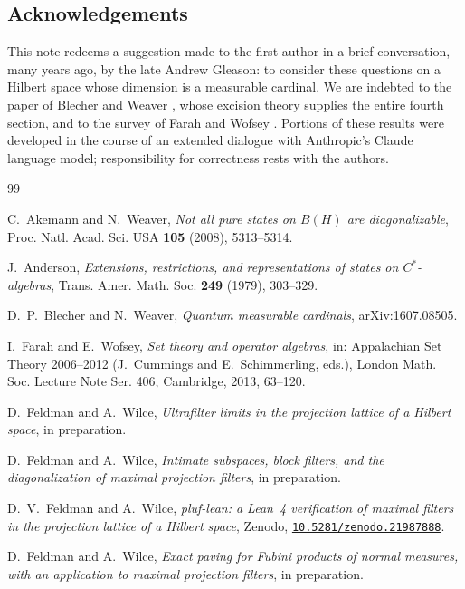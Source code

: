 \documentclass[11pt,reqno]{amsart}
\theoremstyle{definition}
\begin{document}
\subsection*{Acknowledgements}
This note redeems a suggestion made to the first author in a brief conversation, many
years ago, by the late Andrew Gleason: to consider these questions on a Hilbert space
whose dimension is a measurable cardinal. We are indebted to the paper of Blecher and
Weaver \cite{BlecherWeaver}, whose excision theory supplies the entire fourth section,
and to the survey of Farah and Wofsey \cite{FarahWofsey}. Portions of these results
were developed in the course of an extended dialogue with Anthropic's Claude language
model; responsibility for correctness rests with the authors.

\begin{thebibliography}{99}

 C.~Akemann and N.~Weaver, \emph{Not all pure states on $B(H)$ are
diagonalizable}, Proc. Natl. Acad. Sci. USA \textbf{105} (2008), 5313--5314.

 J.~Anderson, \emph{Extensions, restrictions, and representations
of states on $C^*$-algebras}, Trans. Amer. Math. Soc. \textbf{249} (1979), 303--329.

 D.~P.~Blecher and N.~Weaver, \emph{Quantum measurable
cardinals}, arXiv:1607.08505.

 I.~Farah and E.~Wofsey, \emph{Set theory and operator algebras},
in: Appalachian Set Theory 2006--2012 (J.~Cummings and E.~Schimmerling, eds.), London
Math. Soc. Lecture Note Ser. 406, Cambridge, 2013, 63--120.

 D.~Feldman and A.~Wilce, \emph{Ultrafilter limits in the projection
lattice of a Hilbert space}, in preparation.

 D.~Feldman and A.~Wilce, \emph{Intimate subspaces, block filters, and
the diagonalization of maximal projection filters}, in preparation.

 D.~V.~Feldman and A.~Wilce, \emph{pluf-lean: a Lean~4 verification of maximal filters in the projection lattice of a Hilbert space}, Zenodo, \href{https://doi.org/10.5281/zenodo.21987888}{\texttt{10.5281/zenodo.21987888}}.

 D.~Feldman and A.~Wilce, \emph{Exact paving for Fubini products of
normal measures, with an application to maximal projection filters}, in preparation.


\end{thebibliography}
\end{document}
